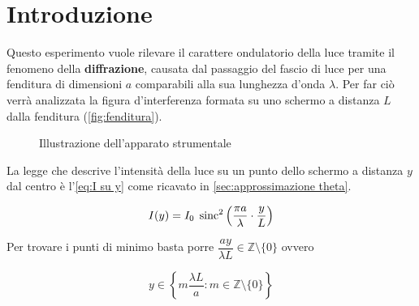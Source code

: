 \documentclass[../main.tex]{subfiles}
\begin{document}
\section{Introduzione}

Questo esperimento vuole rilevare il carattere ondulatorio della luce tramite il fenomeno della \textbf{diffrazione}, causata dal passaggio del fascio di luce per una fenditura di dimensioni $a$ comparabili alla sua lunghezza d'onda $\lambda$. Per far ciò verrà analizzata la figura d'interferenza formata su uno schermo a distanza $L$ dalla fenditura (\autoref{fig:fenditura}).

\begin{figure}[ht!]
    \centering
    \caption{Illustrazione dell'apparato strumentale}
    \label{fig:fenditura}
\end{figure}

La legge che descrive l'intensità della luce su un punto dello schermo a distanza $y$ dal centro è l'\autoref{eq:I su y} come ricavato in \autoref{sec:approssimazione theta}.

\begin{equation} \label{eq:I su y}
    I(y) = I_{0} \; \operatorname{sinc}^{2} \left( \frac{\pi a}{\lambda} \cdot \frac{y}{L}  \right)
\end{equation}

Per trovare i punti di minimo basta porre $\dfrac{a y}{\lambda L} \in \mathbb{Z} \setminus \{0\}$ ovvero

\begin{equation} \label{eq:y=0 values}
    y \in \left\{m\frac{\lambda L}{a}: m \in \mathbb{Z} \setminus \{0\} \right\}
\end{equation}
\end{document}
